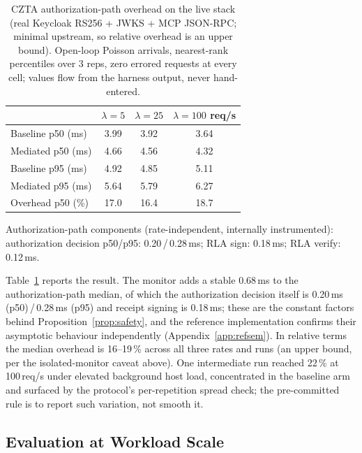 \documentclass[conference]{IEEEtran}
\begin{document}
\begin{table}[t]
\centering
\caption{CZTA authorization-path overhead on the live stack (real
Keycloak RS256 + JWKS + MCP JSON-RPC; minimal upstream, so
relative overhead is an upper bound). Open-loop Poisson arrivals,
nearest-rank percentiles over 3 reps, zero errored requests at
every cell; values flow from the harness output, never
hand-entered.}
\label{tab:overhead}
\scriptsize
\begin{threeparttable}
\setlength{\tabcolsep}{6pt}
\begin{tabular}{@{}l c c c@{}}
\toprule
& $\lambda{=}5$ & $\lambda{=}25$ & $\lambda{=}100$ req/s \\
\midrule
Baseline p50 (ms) & 3.99 & 3.92 & 3.64 \\
Mediated p50 (ms) & 4.66 & 4.56 & 4.32 \\
Baseline p95 (ms) & 4.92 & 4.85 & 5.11 \\
Mediated p95 (ms) & 5.64 & 5.79 & 6.27 \\
Overhead p50 (\%) & 17.0 & 16.4 & 18.7 \\
\bottomrule
\end{tabular}
\begin{tablenotes}[flushleft]\scriptsize
\item Authorization-path components (rate-independent, internally
instrumented): authorization decision p50/p95: 0.20\,/\,0.28\,ms;
RLA sign: 0.18\,ms; RLA verify: 0.12\,ms.
\end{tablenotes}
\end{threeparttable}
\end{table}

Table~\ref{tab:overhead} reports the result. The monitor adds a
stable 0.68\,ms to the authorization-path median, of which the
authorization decision itself is 0.20\,ms (p50)\,/\,0.28\,ms (p95)
and receipt signing is 0.18\,ms; these are the constant factors
behind Proposition~\ref{prop:safety}, and the reference
implementation confirms their asymptotic behaviour independently
(Appendix~\ref{app:refsem}). In relative terms the median overhead
is 16--19\,\% across all three rates and runs (an upper bound, per
the isolated-monitor caveat above). One intermediate run reached
22\,\% at 100\,req/s under elevated background host load,
concentrated in the baseline arm and surfaced by the protocol's
per-repetition spread check; the pre-committed rule is to report
such variation, not smooth it.

\subsection{Evaluation at Workload Scale}
\label{sec:workload}
\end{document}
